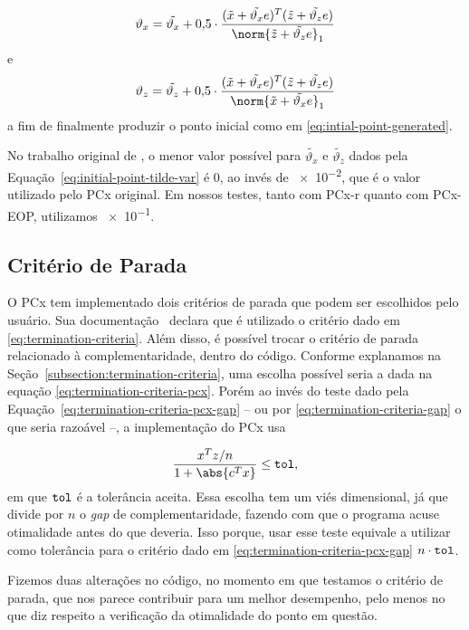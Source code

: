 \begin{equation}
	\label{eq:initial-point-var-x}
\vartheta_{x} = \tilde{\vartheta_x} + \num{0.5}\cdot\dfrac{(\xtil+\tilde{\vartheta_x} e)^{T}(\ztil+\tilde{\vartheta_z} e)}{\norm{\ztil+\tilde{\vartheta_z} e}_{1}} 
\end{equation}
e
\begin{equation}
	\label{eq:initial-point-var-z}
\vartheta_{z} = \tilde{\vartheta_z} + \num{0.5}\cdot\dfrac{(\xtil+\tilde{\vartheta_x} e)^{T}(\ztil+\tilde{\vartheta_z} e)}{\norm{\xtil+\tilde{\vartheta_x} e}_{1}} 
\end{equation}
a fim de finalmente produzir o ponto inicial como em \eqref{eq:intial-point-generated}.

No trabalho original de \textcite{Mehrotra:1992wr}, o menor valor possível para  $\tilde{\vartheta_x}$ e $\tilde{\vartheta_z}$ dados pela Equação~\eqref{eq:initial-point-tilde-var} é $\num{0}$, ao invés de \num{e-2}, 	que é o valor utilizado pelo PCx original. Em nossos testes, tanto com PCx-r quanto com PCx-EOP, utilizamos \num{e-1}. 


\subsection{Critério de Parada}


O PCx tem implementado dois critérios de parada que podem ser escolhidos pelo usuário. Sua   documentação~\cite{Czyzyk:1998vw} declara que é utilizado o critério dado em \eqref{eq:termination-criteria}.   Além disso, é possível trocar o critério de parada relacionado à complementaridade, dentro do código. Conforme explanamos na Seção~\ref{subsection:termination-criteria}, uma escolha possível seria a dada na equação \eqref{eq:termination-criteria-pcx}. Porém ao invés do teste dado pela Equação~\eqref{eq:termination-criteria-pcx-gap} -- ou por \eqref{eq:termination-criteria-gap} o que seria razoável --, a implementação do PCx usa

\[
\dfrac{x^{T}z/n}{1 + \abs{c^Tx}}\leq
	\tol,
\]
em que $\mathtt{tol}$ é a tolerância aceita. Essa escolha tem um viés dimensional, já que divide por $n$ o \emph{gap} de complementaridade, fazendo com que o programa acuse otimalidade  antes do que deveria. Isso porque, usar esse teste equivale a utilizar como tolerância para o critério dado em \eqref{eq:termination-criteria-pcx-gap} $n\cdot\mathtt{tol}$. 


Fizemos duas  alterações no código, no momento em que testamos o critério de parada, que nos parece  contribuir para um melhor desempenho, pelo menos  no que diz respeito a verificação da otimalidade do ponto em questão. 

